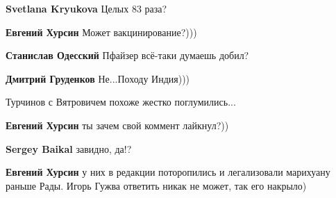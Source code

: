 \begin{itemize}
\begin{itemize}
\textbf{Svetlana Kryukova} Целых 83 раза?

 
\textbf{Евгений Хурсин} Может вакцинирование?)))

 
\textbf{Станислав Одесский} Пфайзер всё-таки думаешь добил?

 
\textbf{Дмитрий Груденков} Не...Походу Индия)))

 
Турчинов с Вятровичем похоже жестко поглумились...

 
\textbf{Евгений Хурсин} ты зачем свой коммент лайкнул?))

 
\textbf{Sergey Baikal} завидно, да!?

 
\textbf{Евгений Хурсин} у них в редакции поторопились и легализовали марихуану раньше Рады. Игорь Гужва ответить никак не может, так его накрыло)


\end{itemize}
\end{itemize}
